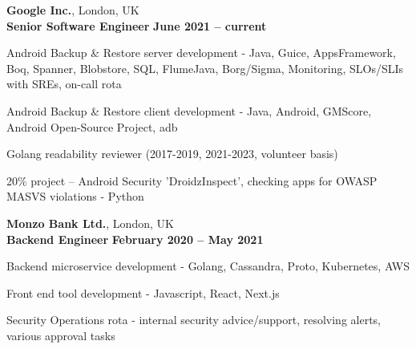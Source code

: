\documentclass[line]{resume}
\begin{document}
\begin{resume}
    \textbf{Google Inc.}, London, UK \vspace{2mm}\\\vspace{1mm}%
    \textbf{Senior Software Engineer} \hfill \textbf{June 2021 -- current}\vspace{-3mm}\\\vspace{-1mm}%
    \begin{list2}
        \item Android Backup \& Restore server development - Java, Guice, AppsFramework, Boq, Spanner, Blobstore, SQL,
        FlumeJava, Borg/Sigma, Monitoring, SLOs/SLIs with SREs, on-call rota
        \item Android Backup \& Restore client development - Java, Android, GMScore, Android Open-Source Project, adb
        \item Golang readability reviewer (2017-2019, 2021-2023, volunteer basis)
        \item 20\% project -- Android Security 'DroidzInspect', checking apps for OWASP MASVS violations - Python
    \end{list2}\vspace{-1.5mm}

    \textbf{Monzo Bank Ltd.}, London, UK \vspace{2mm}\\\vspace{1mm}%
    \textbf{Backend Engineer} \hfill \textbf{February 2020 -- May 2021}\vspace{-3mm}\\\vspace{-1mm}%
    \begin{list2}
        \item Backend microservice development - Golang, Cassandra, Proto, Kubernetes, AWS
        \item Front end tool development - Javascript, React, Next.js
        \item Security Operations rota - internal security advice/support, resolving alerts, various approval tasks
    \end{list2}\vspace{-1.5mm}


\end{resume}
\end{document}
